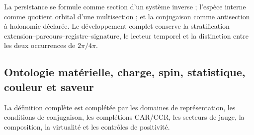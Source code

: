 La persistance se formule comme section d’un système inverse ; l’espèce interne comme quotient orbital d’une multisection ; et la conjugaison comme antisection à holonomie déclarée. Le développement complet conserve la stratification extension--parcours--registre--signature, le lecteur temporel et la distinction entre les deux occurrences de \(2\pi/4\pi\).

\begingroup
\let\chapter\section
\let\section\subsection
\let\subsection\subsubsection
\let\subsubsection\paragraph
\let\clearpage\relax
\let\cleardoublepage\relax

\endgroup

\section{Ontologie matérielle, charge, spin, statistique, couleur et saveur}
La définition complète est complétée par les domaines de représentation, les conditions de conjugaison, les complétions CAR/CCR, les secteurs de jauge, la composition, la virtualité et les contrôles de positivité.


